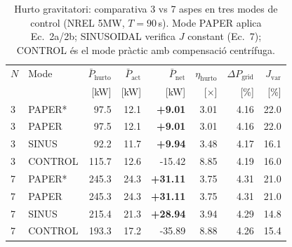 \begin{table}[htbp]
\centering
\caption{Hurto gravitatori: comparativa 3 vs 7 aspes en tres modes de control (NREL 5MW, $T=90$\,s). Mode PAPER aplica Ec.~2a/2b; SINUSOIDAL verifica $J$ constant (Ec.~7); CONTROL és el mode pràctic amb compensació centrífuga.}
\label{tab:hurto_3vs7}
\begin{tabular}{llrrrrrr}
\toprule
$N$ & Mode & $\bar{P}_{\text{hurto}}$ & $\bar{P}_{\text{act}}$ & $\bar{P}_{\text{net}}$ & $\eta_{\text{hurto}}$ & $\Delta P_{\text{grid}}$ & $J_{\text{var}}$ \\
 & & [kW] & [kW] & [kW] & [$\times$] & [\%] & [\%] \\
\midrule
3 & PAPER* & 97.5 & 12.1 & \textbf{+9.01} & 3.01 & 4.16 & 22.0 \\
3 & PAPER & 97.5 & 12.1 & \textbf{+9.01} & 3.01 & 4.16 & 22.0 \\
3 & SINUS & 92.2 & 11.7 & \textbf{+9.94} & 3.48 & 4.17 & 16.1 \\
3 & CONTROL & 115.7 & 12.6 & -15.42 & 8.85 & 4.19 & 16.0 \\
\midrule
7 & PAPER* & 245.3 & 24.3 & \textbf{+31.11} & 3.75 & 4.31 & 21.0 \\
7 & PAPER & 245.3 & 24.3 & \textbf{+31.11} & 3.75 & 4.31 & 21.0 \\
7 & SINUS & 215.4 & 21.3 & \textbf{+28.94} & 3.94 & 4.29 & 14.8 \\
7 & CONTROL & 193.3 & 17.2 & -35.89 & 8.88 & 4.26 & 15.4 \\
\bottomrule
\end{tabular}
\end{table}
